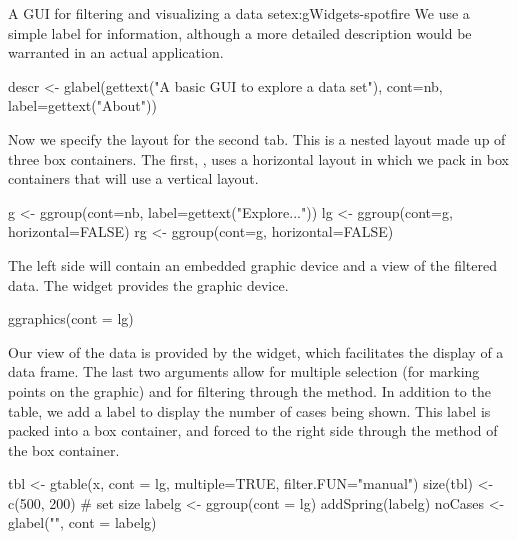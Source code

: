 \begin{example}{A GUI for filtering and visualizing a data set}{ex:gWidgets-spotfire}
We use a simple label for information, although a more detailed
description would be warranted in an actual application.

\begin{Schunk}
\begin{Sinput}
 descr <- glabel(gettext("A basic GUI to explore a data set"), 
                 cont=nb, label=gettext("About"))
\end{Sinput}
\end{Schunk}
%
Now we specify the layout for the second tab. This is a nested layout
made up of three box containers. The first, , uses a
horizontal layout in which we pack in box containers that will use a
vertical layout.

\begin{Schunk}
\begin{Sinput}
 g <- ggroup(cont=nb, label=gettext("Explore..."))
 lg <- ggroup(cont=g, horizontal=FALSE) 
 rg <- ggroup(cont=g, horizontal=FALSE)
\end{Sinput}
\end{Schunk}

The left side will contain an embedded graphic device and a view of
the filtered data. The  widget provides the
graphic device.
\begin{Schunk}
\begin{Sinput}
 ggraphics(cont = lg)
\end{Sinput}
\end{Schunk}

Our view of the data is provided by the  widget,
which facilitates the display of a data frame. The last two arguments
allow for multiple selection (for marking points on the graphic) and
for filtering through the  method.
In addition to the table, we add a label to display the number of
cases being shown. This label is packed into a box container, and
forced to the right side through the  method
of the box container.
\begin{Schunk}
\begin{Sinput}
 tbl <- gtable(x, cont = lg, multiple=TRUE, filter.FUN="manual")
 size(tbl) <- c(500, 200)                # set size
 labelg <- ggroup(cont = lg)
 addSpring(labelg)
 noCases <- glabel("", cont = labelg)
\end{Sinput}
\end{Schunk}


\end{example}
